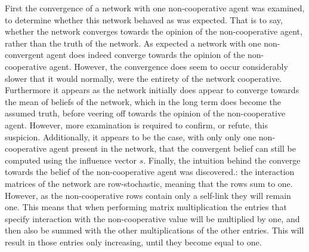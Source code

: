 \documentclass{article}
\begin{document}
First the convergence of a network with one non-cooperative agent was examined, to determine whether this network behaved as was expected. That is to say, whether the network converges towards the opinion of the non-cooperative agent, rather than the truth of the network. As expected a network with one non-convergent agent does indeed converge towards the opinion of the non-cooperative agent. However, the convergence does seem to occur considerably slower that it would normally, were the entirety of the network cooperative. Furthermore it appears as the network initially does appear to converge towards the mean of beliefs of the network, which in the long term does become the assumed truth, before veering off towards the opinion of the non-cooperative agent. However, more examination is required to confirm, or refute, this suspicion. Additionally, it appears to be the case, with only only one non-cooperative agent present in the network, that the convergent belief can still be computed using the influence vector $s$.
Finally, the intuition behind the converge towards the belief of the non-cooperative agent was discovered.: the interaction matrices of the network are row-stochastic, meaning that the rows sum to one. However, as the non-cooperative rows contain only a self-link they will remain one. This means that when performing matrix multiplication the entries that specify interaction with the non-cooperative value will be multiplied by one, and then also be summed with the other multiplications of the other entries. This will result in those entries only increasing, until they become equal to one. \newline
\end{document}
